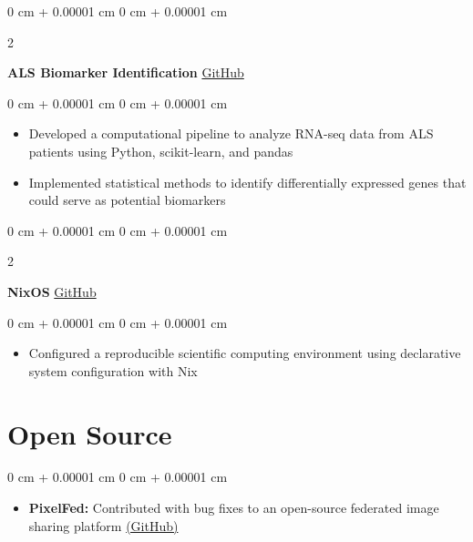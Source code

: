 \documentclass[10pt, letterpaper]{article}
\newenvironment{highlights}{
    \begin{itemize}[
        topsep=0.10 cm,
        parsep=0.10 cm,
        partopsep=0pt,
        itemsep=0pt,
        leftmargin=0 cm + 10pt
    ]
}{
    \end{itemize}
} %
\newenvironment{onecolentry}{
    \begin{adjustwidth}{
        0 cm + 0.00001 cm
    }{
        0 cm + 0.00001 cm
    }
}{
    \end{adjustwidth}
} %
\newenvironment{twocolentry}[2][]{
    \onecolentry
    \def\secondColumn{#2}
    \setcolumnwidth{\fill, 4.5 cm}
    \begin{paracol}{2}
}{
    \switchcolumn \raggedleft \secondColumn
    \end{paracol}
    \endonecolentry
} %
\begin{document}
        \begin{twocolentry}{
            \href{https://github.com/demic-dev/als-biomarker-identification-project}{GitHub}
        }
        \textbf{ALS Biomarker Identification}\end{twocolentry}

        \vspace{0.10 cm}
        \begin{onecolentry}
            \begin{highlights}
                \item Developed a computational pipeline to analyze RNA-seq data from ALS patients using Python, scikit-learn, and pandas
                \item Implemented statistical methods to identify differentially expressed genes that could serve as potential biomarkers
            \end{highlights}
        \end{onecolentry}

        \vspace{0.2 cm}

        \begin{twocolentry}{
            \href{https://github.com/demic-dev/nixos-config}{GitHub}
        }
          \textbf{NixOS}\end{twocolentry}

        \vspace{0.10 cm}
        \begin{onecolentry}
            \begin{highlights}
                \item Configured a reproducible scientific computing environment using declarative system configuration with Nix
            \end{highlights}
        \end{onecolentry}

        \vspace{0.2 cm}

    \section{Open Source}
        \begin{onecolentry}
            \begin{highlights}
                \item \textbf{PixelFed:} Contributed with bug fixes to an open-source federated image sharing platform \href{https://github.com/pixelfed/pixelfed-rn/pulls?q=author%3Ademic-dev}{(GitHub)}
            \end{highlights}
        \end{onecolentry}
\end{document}

